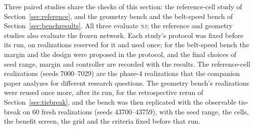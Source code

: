 \documentclass[11pt,a4paper]{article}
\newcommand{\nj}{\textsc{nj}}
\begin{document}
Three paired studies share the checks of this section: the reference-cell study of Section~\ref{sec:reference}, and the geometry bench and the belt-speed bench of Section~\ref{sec:benchresults}. All three evaluate \nj; the reference and geometry studies also evaluate the frozen network. Each study's protocol was fixed before its run, on realizations reserved for it and used once; for the belt-speed bench the margin and the design were proposed in the protocol, and the final choices of seed range, margin and controller are recorded with the results. The reference-cell realizations (seeds 7000--7029) are the phase-4 realizations that the companion paper analyzes for different research questions. The geometry bench's realizations were reused once more, after its run, for the retrospective rerun of Section~\ref{sec:tiebreak}, and the bench was then replicated with the observable tie-break on 60 fresh realizations (seeds 43700--43759), with the seed range, the cells, the benefit screen, the grid and the criteria fixed before that run.
\end{document}
